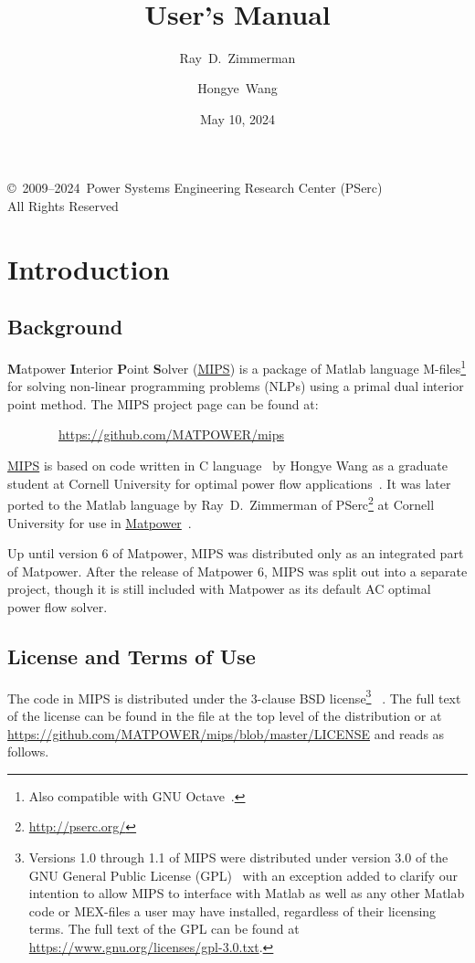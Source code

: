 \documentclass[12pt]{article}
\title{\mipsname{}\\\mips{} \mipsver{}\\
User's Manual}
\author{Ray~D.~Zimmerman \and Hongye~Wang}
\date{May 10, 2024} %
\newcommand{\matlab}[0]{{\sc Matlab}}
\newcommand{\matpower}[0]{{\sc Matpower}}
\newcommand{\matpowerurl}[0]{https://matpower.org}
\newcommand{\matpowerlink}[0]{\href{\matpowerurl}{\matpower{}}}
\newcommand{\mips}[0]{{MIPS}}
\newcommand{\mipsurl}[0]{https://github.com/MATPOWER/mips}
\newcommand{\mipslink}[0]{\href{\mipsurl}{\mips{}}}
\newcommand{\mipsname}[0]{{{\bf M}{\sc atpower} \textbf{I}nterior \textbf{P}oint \textbf{S}olver}}
\newcommand{\pserc}[0]{{\sc PSerc}}
\newcommand{\PSERC}[0]{{Power Systems Engineering Research Center (\pserc{})}}
\newcommand{\code}[1]{{\relsize{-0.5}{\tt{{#1}}}}}  %
\numberwithin{equation}{section}
\numberwithin{table}{section}
\numberwithin{figure}{section}
\begin{document}
\maketitle
\thispagestyle{empty}
\vfill
\begin{center}
{\scriptsize
\copyright~2009--2024~\PSERC{}\\
All Rights Reserved}
\end{center}

\clearpage
\tableofcontents
\clearpage
\listoftables

\clearpage
\section{Introduction}

\subsection{Background}

\mipsname{} (\mipslink{}) is a package of \matlab{} language M-files\footnote{Also compatible with GNU Octave~\cite{octave}.} for solving non-linear programming problems (NLPs) using a primal dual interior point method. The \mips{} project page can be found at:

\bigskip

~~~~~~~~\url{\mipsurl}

\bigskip

\mipslink{} is based on code written in C language~\cite{tspopf} by Hongye Wang as a graduate student at Cornell University for optimal power flow applications~\cite{wang2007a,wang2007}. It was later ported to the \matlab{} language by Ray~D.~Zimmerman of \pserc{}\footnote{\url{http://pserc.org/}} at Cornell University for use in \matpowerlink{}~\cite{zimmerman2011,matpower}.

Up until version 6 of \matpower{}, \mips{} was distributed only as an integrated part of \matpower{}. After the release of \matpower{} 6, \mips{} was split out into a separate project, though it is still included with \matpower{} as its default AC optimal power flow solver.


\clearpage
\subsection{License and Terms of Use}

The code in \mips{} is distributed under the 3-clause BSD license\footnote{Versions 1.0 through 1.1 of \mips{} were distributed under version 3.0 of the GNU General Public License (GPL)~\cite{gpl} with an exception added to clarify our intention to allow \mips{} to interface with \matlab{} as well as any other \matlab{} code or MEX-files a user may have installed, regardless of their licensing terms. The full text of the GPL can be found at \url{https://www.gnu.org/licenses/gpl-3.0.txt}.}
~\cite{bsd}. The full text of the license can be found in the \code{LICENSE} file at the top level of the distribution or at \url{https://github.com/MATPOWER/mips/blob/master/LICENSE} and reads as follows.
\end{document}
